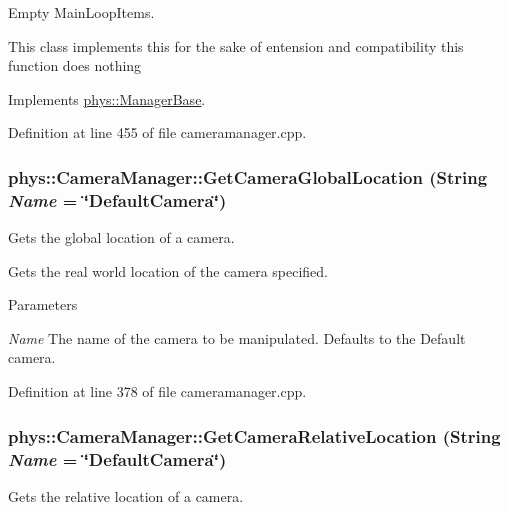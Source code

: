 Empty MainLoopItems. 

This class implements this for the sake of entension and compatibility this function does nothing 

Implements \hyperlink{classphys_1_1ManagerBase_aa9e13a3f7c398b708f0f242610b5abf7}{phys::ManagerBase}.



Definition at line 455 of file cameramanager.cpp.

\hypertarget{classphys_1_1CameraManager_a53ef7e8f0a4227a5a35db88fe74772fa}{
\subsubsection[{GetCameraGlobalLocation}]{ phys::CameraManager::GetCameraGlobalLocation ({\bf String} {\em Name} = {\ttfamily \char`\"{}DefaultCamera\char`\"{}})}}
\label{d9/d91/classphys_1_1CameraManager_a53ef7e8f0a4227a5a35db88fe74772fa}


Gets the global location of a camera. 

Gets the real world location of the camera specified. 
\begin{DoxyParams}{Parameters}
\item[{\em Name}]The name of the camera to be manipulated. Defaults to the Default camera. \end{DoxyParams}


Definition at line 378 of file cameramanager.cpp.

\hypertarget{classphys_1_1CameraManager_a8557218460fbc94a029f74945fa2517c}{
\subsubsection[{GetCameraRelativeLocation}]{ phys::CameraManager::GetCameraRelativeLocation ({\bf String} {\em Name} = {\ttfamily \char`\"{}DefaultCamera\char`\"{}})}}
\label{d9/d91/classphys_1_1CameraManager_a8557218460fbc94a029f74945fa2517c}


Gets the relative location of a camera. 

